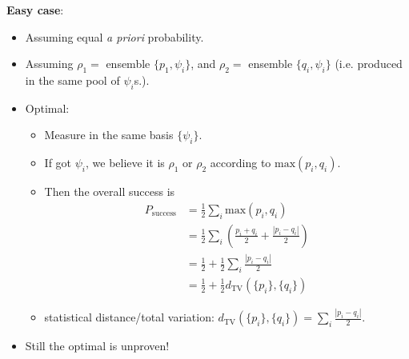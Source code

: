\documentclass{article}
\begin{document}
\textbf{Easy case}: 
\begin{itemize}
  \item Assuming equal \textit{a priori} probability.
  \item Assuming $\rho_1=$ ensemble $\{p_1,\psi_i\}$, and $\rho_2=$
    ensemble $\{q_i,\psi_i\}$ (i.e. produced in the same pool of
    $\psi_i$s.).
  \item Optimal:
    \begin{itemize}
      \item Measure in the same basis $\{\psi_i\}$.
      \item If got $\psi_i$, we believe it is $\rho_1$ or $\rho_2$ according to
        $\text{max}(p_i,q_i)$.
      \item Then the overall success is
        \begin{align*}
          P_\text{success} &=
          \frac{1}{2} \sum_i \text{max}(p_i,q_i) \\
          &= \frac{1}{2} \sum_i \left( \frac{p_i+q_i}{2} + \frac{|p_i-q_i|}{2} \right) \\
          &= \frac{1}{2} + \frac{1}{2} \sum_i \frac{|p_i-q_i|}{2} \\
          &= \frac{1}{2} + \frac{1}{2} d_\text{TV}(\{p_i\},\{q_i\})
        \end{align*}
      \item statistical distance/total variation: $d_\text{TV}(\{p_i\},\{q_i\})
        = \sum_i \frac{|p_i-q_i|}{2}$.
    \end{itemize}
  \item Still the optimal is unproven!
\end{itemize}


% 
\end{document}

